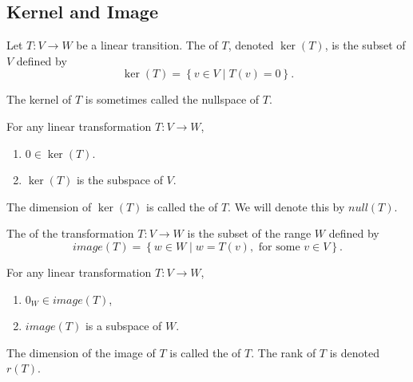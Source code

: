 \subsection{Kernel and Image}
\begin{definition}
  Let $T : V \to W$ be a linear transition. The  of $T$, denoted $\ker(T)$, is the subset of $V$ defined by
  \begin{equation*}
    \ker(T) = \left\{v \in V \mid T(v) = 0\right\}.
  \end{equation*}
  \end{definition}

  The kernel of $T$ is sometimes called the nullspace of $T$.

\begin{theorem}
  For any linear transformation $T : V \to W$,
  \begin{enumerate}[(1)]
    \item $0 \in \ker(T)$.
    \item $\ker(T)$ is the subspace of $V$.
  \end{enumerate}
\end{theorem}

\begin{definition}
  The dimension of $\ker(T)$ is called the  of $T$. We will denote this by $null(T)$.
\end{definition}

\begin{definition}
  The  of the transformation $T : V \to W$ is the subset of the range $W$ defined by
  \begin{equation*}
    image(T) = \left\{w \in W \mid w = T(v), \text{ for some } v \in V\right\}.
  \end{equation*}
\end{definition}

\begin{theorem}
  For any linear transformation $T : V \to W$,
  \begin{enumerate}[(1)]
    \item $0_W \in image(T)$,
    \item $image(T)$ is a subspace of $W$.
  \end{enumerate}
\end{theorem}

\begin{definition}
  The dimension of the image of $T$ is called the  of $T$. The rank of $T$ is denoted $r(T)$.
\end{definition}

